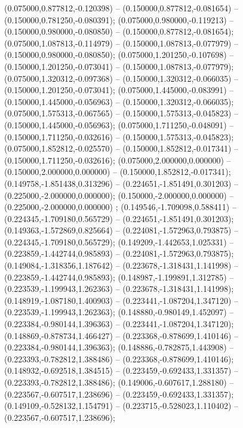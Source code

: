  (0.075000,0.877812,-0.120398) -- (0.150000,0.877812,-0.081654) -- (0.150000,0.781250,-0.080391);
 (0.075000,0.980000,-0.119213) -- (0.150000,0.980000,-0.080850) -- (0.150000,0.877812,-0.081654);
 (0.075000,1.087813,-0.114979) -- (0.150000,1.087813,-0.077979) -- (0.150000,0.980000,-0.080850);
 (0.075000,1.201250,-0.107698) -- (0.150000,1.201250,-0.073041) -- (0.150000,1.087813,-0.077979);
 (0.075000,1.320312,-0.097368) -- (0.150000,1.320312,-0.066035) -- (0.150000,1.201250,-0.073041);
 (0.075000,1.445000,-0.083991) -- (0.150000,1.445000,-0.056963) -- (0.150000,1.320312,-0.066035);
 (0.075000,1.575313,-0.067565) -- (0.150000,1.575313,-0.045823) -- (0.150000,1.445000,-0.056963);
 (0.075000,1.711250,-0.048091) -- (0.150000,1.711250,-0.032616) -- (0.150000,1.575313,-0.045823);
 (0.075000,1.852812,-0.025570) -- (0.150000,1.852812,-0.017341) -- (0.150000,1.711250,-0.032616);
 (0.075000,2.000000,0.000000) -- (0.150000,2.000000,0.000000) -- (0.150000,1.852812,-0.017341);
 (0.149758,-1.851438,0.313296) -- (0.224651,-1.851491,0.301203) -- (0.225000,-2.000000,0.000000);
 (0.150000,-2.000000,0.000000) -- (0.225000,-2.000000,0.000000) ;
 (0.149546,-1.709098,0.588411) -- (0.224345,-1.709180,0.565729) -- (0.224651,-1.851491,0.301203);
 (0.149363,-1.572869,0.825664) -- (0.224081,-1.572963,0.793875) -- (0.224345,-1.709180,0.565729);
 (0.149209,-1.442653,1.025331) -- (0.223859,-1.442744,0.985893) -- (0.224081,-1.572963,0.793875);
 (0.149084,-1.318356,1.187642) -- (0.223678,-1.318431,1.141998) -- (0.223859,-1.442744,0.985893);
 (0.148987,-1.199891,1.312785) -- (0.223539,-1.199943,1.262363) -- (0.223678,-1.318431,1.141998);
 (0.148919,-1.087180,1.400903) -- (0.223441,-1.087204,1.347120) -- (0.223539,-1.199943,1.262363);
 (0.148880,-0.980149,1.452097) -- (0.223384,-0.980144,1.396363) -- (0.223441,-1.087204,1.347120);
 (0.148869,-0.878734,1.466427) -- (0.223368,-0.878699,1.410146) -- (0.223384,-0.980144,1.396363);
 (0.148886,-0.782875,1.443908) -- (0.223393,-0.782812,1.388486) -- (0.223368,-0.878699,1.410146);
 (0.148932,-0.692518,1.384515) -- (0.223459,-0.692433,1.331357) -- (0.223393,-0.782812,1.388486);
 (0.149006,-0.607617,1.288180) -- (0.223567,-0.607517,1.238696) -- (0.223459,-0.692433,1.331357);
 (0.149109,-0.528132,1.154791) -- (0.223715,-0.528023,1.110402) -- (0.223567,-0.607517,1.238696);
